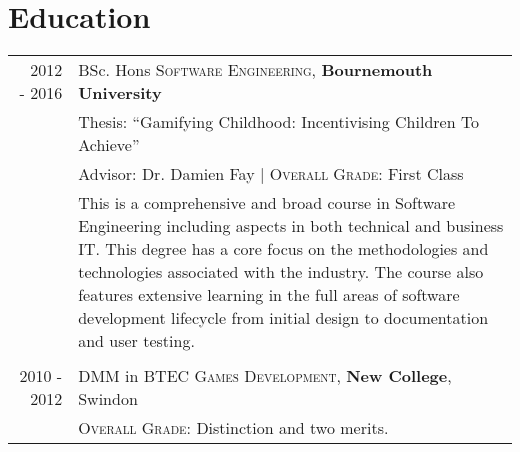\section{Education}
\begin{tabular}{r|p{11cm}}
	\ 2012 - 2016 & BSc. Hons \textsc{Software Engineering}, \textbf{Bournemouth University}\\ 
	\ & Thesis: ``Gamifying Childhood: Incentivising Children To Achieve'' \\
	\ & Advisor: Dr. Damien Fay | \normalsize \textsc{Overall Grade}: First Class \\
	\ & \footnotesize{This is a comprehensive and broad course in Software Engineering including aspects in both technical and business IT. This degree has a core focus on the methodologies and technologies associated with the industry. The course also features extensive learning in the full areas of software development lifecycle from initial design to documentation and user testing.} \\

	\multicolumn{2}{c}{} \\


	2010 - 2012 & DMM in BTEC \textsc{Games Development}, \textbf{New College}, Swindon\\
	\ & \textsc{Overall Grade}: Distinction and two merits.
\end{tabular}